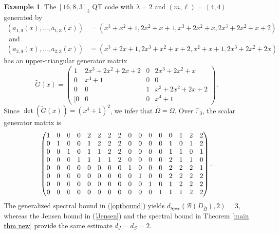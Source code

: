 \documentclass[11pt]{amsart}
\theoremstyle{plain}
\theoremstyle{definition}
\newtheorem{ex}[thm]{Example}
\numberwithin{equation}{section}
\newcommand{\F}{{\mathbb F}}
\begin{document}
\begin{ex}\label{example2}
The $[16,8,3]_3$ QT code with $\lambda=2$ and $(m,\ell)=(4,4)$ generated by
\begin{align*}
(a_{1,0}(x), \ldots, a_{1,3}(x)) &=(x^3 + x^2 + 1, 2x^2 + x + 1, x^3 + 2x^2 + x, 2x^3 + 2x^2 + x + 2)\\
\mbox{ and } \\
(a_{2,0}(x), \ldots, a_{2,3}(x)) &=(x^3 + 2x + 1, 2x^3 + x^2 + x + 2, x^2 + x + 1, 2x^3 + 2x^2 + 2x)
\end{align*}
has an upper-triangular generator matrix
\[
\widetilde{G}(x) =
\begin{pmatrix}
1 &  2x^3 + 2x^2 + 2x + 2 &  0 &  2x^3 + 2x^2 + x\\
0 &  x^4 + 1 &  0 &  0\\
0 &  0 &  1 &  x^3 + 2x^2 + 2x + 2\\
[0 &  0 &  0 &  x^4 + 1
\end{pmatrix}.
\]
Since $\det(\widetilde{G}(x)) =(x^4+1)^2$, we infer that $\overline{\Omega}=\Omega$. Over $\F_3$, the scalar generator matrix is
\[
\setcounter{MaxMatrixCols}{20}
\begin{pmatrix}
1 & 0 & 0 & 0 & 2 & 2 & 2 & 2 & 0 & 0 & 0 & 0 & 0 & 1 & 2 & 2\\
0 & 1 & 0 & 0 & 1 & 2 & 2 & 2 & 0 & 0 & 0 & 0 & 1 & 0 & 1 & 2\\
0 & 0 & 1 & 0 & 1 & 1 & 2 & 2 & 0 & 0 & 0 & 0 & 1 & 1 & 0 & 1\\
0 & 0 & 0 & 1 & 1 & 1 & 1 & 2 & 0 & 0 & 0 & 0 & 2 & 1 & 1 & 0\\
0 & 0 & 0 & 0 & 0 & 0 & 0 & 0 & 1 & 0 & 0 & 0 & 2 & 2 & 2 & 1\\
0 & 0 & 0 & 0 & 0 & 0 & 0 & 0 & 0 & 1 & 0 & 0 & 2 & 2 & 2 & 2\\
0 & 0 & 0 & 0 & 0 & 0 & 0 & 0 & 0 & 0 & 1 & 0 & 1 & 2 & 2 & 2\\
0 & 0 & 0 & 0 & 0 & 0 & 0 & 0 & 0 & 0 & 0 & 1 & 1 & 1 & 2 & 2\\
\end{pmatrix}. \vspace{10pt}
\]
The generalized spectral bound in (\ref{optbound}) yields $d_{Spec}(\mathcal{B}(D_{\overline{\Omega}}),2)=3$, whereas the Jensen bound in (\ref{Jensen}) and the spectral bound in Theorem \ref{main thm new} provide the same estimate $d_J=d_S=2$. 
\end{ex}
\end{document}
